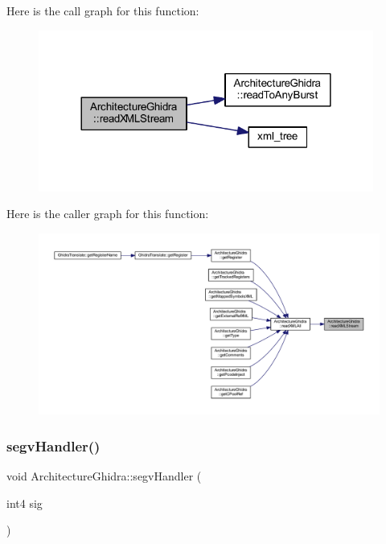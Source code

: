 Here is the call graph for this function\+:
\nopagebreak
\begin{figure}[H]
\begin{center}
\leavevmode
\includegraphics[width=312pt]{class_architecture_ghidra_a76b1d30cc0f0f69f003ba3aceccd8063_cgraph}
\end{center}
\end{figure}
Here is the caller graph for this function\+:
\nopagebreak
\begin{figure}[H]
\begin{center}
\leavevmode
\includegraphics[width=350pt]{class_architecture_ghidra_a76b1d30cc0f0f69f003ba3aceccd8063_icgraph}
\end{center}
\end{figure}
\mbox{\label{class_architecture_ghidra_a606fbae6a63c41723343137c56f84eca}} 
\subsubsection{\texorpdfstring{segvHandler()}{segvHandler()}}
{\footnotesize\ttfamily void Architecture\+Ghidra\+::segv\+Handler (\begin{DoxyParamCaption}\item[{int4}]{sig }\end{DoxyParamCaption})\hspace{0.3cm}{\ttfamily [static]}}



